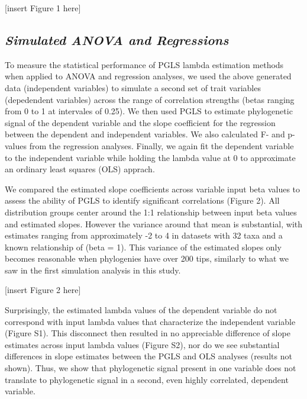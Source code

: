 \documentclass[
]{article}
\begin{document}
{[}insert Figure 1 here{]}

\hypertarget{simulated-anova-and-regressions}{%
\subsection{\texorpdfstring{\emph{Simulated ANOVA and
Regressions}}{Simulated ANOVA and Regressions}}\label{simulated-anova-and-regressions}}

To measure the statistical performance of PGLS lambda estimation methods
when applied to ANOVA and regression analyses, we used the above
generated data (independent variables) to simulate a second set of trait
variables (depedendent variables) across the range of correlation
strengths (betas ranging from 0 to 1 at intervales of 0.25). We then
used PGLS to estimate phylogenetic signal of the dependent variable and
the slope coefficient for the regression between the dependent and
independent variables. We also calculated F- and p-values from the
regression analyses. Finally, we again fit the dependent variable to the
independent variable while holding the lambda value at 0 to approximate
an ordinary least squares (OLS) apprach. \hfill\break

We compared the estimated slope coefficients across variable input beta
values to assess the ability of PGLS to identify significant
correlations (Figure 2). All distribution groups center around the 1:1
relationship between input beta values and estimated slopes. However the
variance around that mean is substantial, with estimates ranging from
approximately -2 to 4 in datasets with 32 taxa and a known relationship
of (beta = 1). This variance of the estimated slopes only becomes
reasonable when phylogenies have over 200 tips, similarly to what we saw
in the first simulation analysis in this study. \hfill\break

{[}insert Figure 2 here{]} \hfill\break 

Surprisingly, the estimated lambda values of the dependent variable do
not correspond with input lambda values that characterize the
independent variable (Figure S1). This disconnect then resulted in no
appreciable difference of slope estimates across input lambda values
(Figure S2), nor do we see substantial differences in slope estimates
between the PGLS and OLS analyses (results not shown). Thus, we show
that phylogenetic signal present in one variable does not translate to
phylogenetic signal in a second, even highly correlated, dependent
variable. \hfill\break
\end{document}
